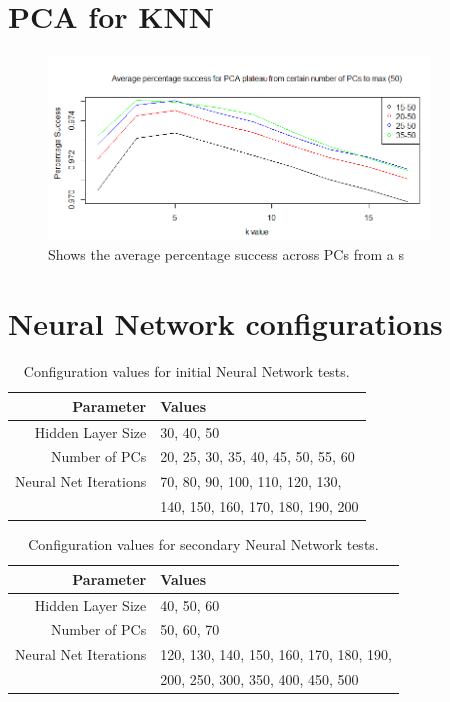 \documentclass[11pt]{article} %
\begin{document}
\section{PCA for KNN}
\label{sec:App_PCA}

\begin{figure}[htb!]
\includegraphics[width = 0.9\textwidth]{pca_knn_avplateau.png}
\caption{Shows the average percentage success across PCs from a s} 
\label{fig:pca_knn_avplateau}
\end{figure}

\section{Neural Network configurations}
\label{sec:AppNNetConfig}

\begin{table}[h!]
\begin{center}
\begin{tabular}{rl}
Parameter & Values \\
\hline
Hidden Layer Size & 30, 40, 50\\
Number of PCs & 20, 25, 30, 35, 40, 45, 50, 55, 60\\
Neural Net Iterations & 70, 80, 90, 100, 110, 120, 130,\\
& 140, 150, 160, 170, 180, 190, 200\\
\hline
\end{tabular}
\caption{Configuration values for initial Neural Network tests.}
\label{nnet_parameters_init}
\end{center}
\end{table}


\begin{table}[h!]
\begin{center}
\begin{tabular}{rl}
Parameter & Values \\
\hline
Hidden Layer Size & 40, 50, 60\\
Number of PCs & 50, 60, 70\\
Neural Net Iterations &  120, 130, 140, 150, 160, 170, 180, 190,\\
& 200, 250, 300, 350, 400, 450, 500\\
\hline
\end{tabular}
\caption{Configuration values for secondary Neural Network tests.}
\label{nnet_parameters_second}
\end{center}
\end{table}
\end{document}
